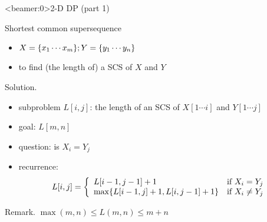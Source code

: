 \begin{frame}<beamer:0>{2-D DP (part 1)}
  \begin{exampleblock}{Shortest common supersequence }
    \begin{itemize}
      \item $X = \{x_{1} \cdots x_{m}\}; Y = \{y_{1} \cdots y_{n}\}$
      \item to find (the length of) a SCS of $X$ and $Y$
    \end{itemize}
  \end{exampleblock}

  \begin{block}{Solution.}
    \begin{itemize}
      \item subproblem $L[i,j]$: the length of an SCS of $X[1 \cdots i]$ and $Y[1 \cdots j]$
      \item goal: $L[m,n]$
      \item question: is $X_{i} = Y_{j}$
      \item recurrence:
	\begin{displaymath}
	  L[i,j] = \left\{ \begin{array}{ll}
	    L[i-1, j-1] + 1 & \textrm{if $X_{i} = Y_{j}$}\\
	    \max \{L[i-1,j] + 1, L[i,j-1] + 1\} & \textrm{if $X_{i} \neq Y_{j}$}
	  \end{array} \right.
	\end{displaymath}
    \end{itemize}
  \end{block}

  \begin{alertblock}{Remark.}
    $\max(m,n) \le L(m,n) \le m+n$
  \end{alertblock}
\end{frame}
